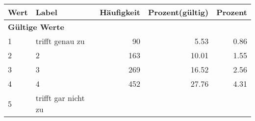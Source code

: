      \begin{longtable}{lXrrr}
     \toprule
     \textbf{Wert} & \textbf{Label} & \textbf{Häufigkeit} & \textbf{Prozent(gültig)} & \textbf{Prozent} \\
     \endhead
     \midrule
     \multicolumn{5}{l}{\textbf{Gültige Werte}}\\

     1 &
     \multicolumn{1}{X}{ trifft genau zu   } &


       \num{90} &
       \num[round-mode=places,round-precision=2]{5.53} &
         \num[round-mode=places,round-precision=2]{0.86} \\

     2 &
     \multicolumn{1}{X}{ 2   } &


       \num{163} &
       \num[round-mode=places,round-precision=2]{10.01} &
         \num[round-mode=places,round-precision=2]{1.55} \\

     3 &
     \multicolumn{1}{X}{ 3   } &


       \num{269} &
       \num[round-mode=places,round-precision=2]{16.52} &
         \num[round-mode=places,round-precision=2]{2.56} \\

     4 &
     \multicolumn{1}{X}{ 4   } &


       \num{452} &
       \num[round-mode=places,round-precision=2]{27.76} &
         \num[round-mode=places,round-precision=2]{4.31} \\

     5 &
     \multicolumn{1}{X}{ trifft gar nicht zu   } &



\end{longtable}
